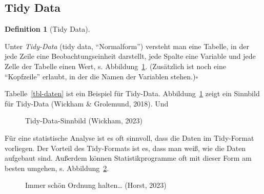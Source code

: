 \documentclass[
  letterpaper,
]{scrbook}
\theoremstyle{definition}
\theoremstyle{definition}
\theoremstyle{definition}
\newtheorem{definition}{Definition}[chapter]
\theoremstyle{remark}
\begin{document}
\subsection{Tidy Data}\label{tidy-data}

\begin{definition}[Tidy
Data]\protect\hypertarget{def-tidy}{}\label{def-tidy}

Unter \emph{Tidy-Data} (tidy data, \enquote{Normalform}) versteht man
eine Tabelle, in der jede Zeile eine Beobachtungseinheit darstellt, jede
Spalte eine Variable und jede Zelle der Tabelle einen Wert, s.
Abbildung~\ref{fig-tidy1}. (Zusätzlich ist noch eine \enquote{Kopfzeile}
erlaubt, in der die Namen der Variablen stehen.)\(\square\)

\end{definition}

Tabelle~\ref{tbl-daten} ist ein Beispiel für Tidy-Data.
Abbildung~\ref{fig-tidy1} zeigt ein Sinnbild für Tidy-Data (Wickham \&
Grolemund, 2018). Und

\begin{figure}


\caption{\label{fig-tidy1}Tidy-Data-Sinnbild (Wickham, 2023)}

\end{figure}%

Für eine statistische Analyse ist es oft sinnvoll, dass die Daten im
Tidy-Format vorliegen. Der Vorteil des Tidy-Formats ist es, dass man
weiß, wie die Daten aufgebaut sind. Außerdem können Statistikprogramme
oft mit dieser Form am besten umgehen, s. Abbildung~\ref{fig-tidy3}.

\begin{figure}


\caption{\label{fig-tidy3}Immer schön Ordnung halten\ldots{} (Horst,
2023)}

\end{figure}%
\end{document}
